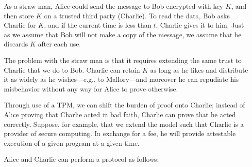 \documentclass{article}
\begin{document}
As a straw man, Alice could send the message to Bob encrypted with key $K$, and then store $K$ on a trusted third party (Charlie). To read the data, Bob asks Charlie for $K$, and if the current time is less than $t$, Charlie gives it to him. Just as we assume that Bob will not make a copy of the message, we assume that he discards $K$ after each use.

The problem with the straw man is that it requires extending the same trust to Charlie that we do to Bob. Charlie can retain $K$ as long as he likes and distribute it as widely as he wishes---e.g., to Mallory---and moreover he can repudiate his misbehavior without any way for Alice to prove otherwise.

Through use of a TPM, we can shift the burden of proof onto Charlie; instead of Alice proving that Charlie acted in bad faith, Charlie can prove that he acted correctly. Suppose, for example, that we extend the model such that Charlie is a provider of secure computing. In exchange for a fee, he will provide attestable execution of a given program at a given time.

Alice and Charlie can perform a protocol as follows:
\end{document}
